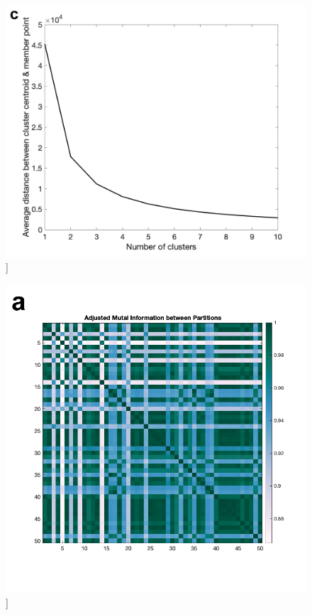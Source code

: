 \documentclass[phd,tocprelim]{cornell}
\renewcommand{\caption}[1]{\singlespacing\hangcaption{#1}\normalspacing}
\begin{document}
\null
\vfill
\begin{figure}[h!]
		\ContinuedFloat
		\captionsetup{labelformat=adja-page}
    \centering
    \includegraphics[width=1\textwidth]{chapter2/SupplementaryFig5c.png}
    \caption[]{}
\end{figure}

\null
\vfill
\clearpage

\null
\vfill
\begin{figure}[h!]
		\ContinuedFloat
		\captionsetup{labelformat=adja-page}
    \centering
    \includegraphics[width=1\textwidth]{chapter2/SupplementaryFig5d.png}
    \caption[]{}
\end{figure}
\end{document}
